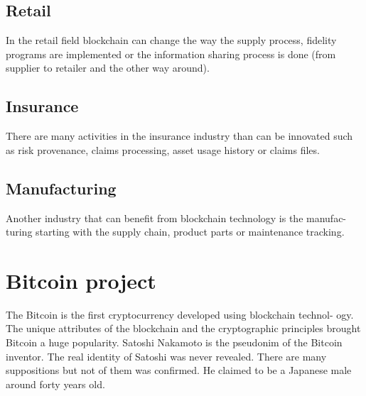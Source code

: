 \subsection{Retail}
\label{sub-sec:chapter2-subsection3}
In the retail field blockchain can change the way the supply process, fidelity
programs are implemented or the information sharing process is done (from
supplier to retailer and the other way around).

\subsection{Insurance}
\label{sub-sec:chapter2-subsection4}
There are many activities in the insurance industry than can be innovated such as risk provenance, claims processing, asset usage history or claims files.

\subsection{Manufacturing}
\label{sub-sec:chapter2-subsection5}
Another industry that can benefit from blockchain technology is the manufac-
turing starting with the supply chain, product parts or maintenance tracking.

\section{Bitcoin project}
The Bitcoin is the first cryptocurrency developed using blockchain technol-
ogy. The unique attributes of the blockchain and the cryptographic principles
brought Bitcoin a huge popularity. Satoshi Nakamoto is the pseudonim of the
Bitcoin inventor. The real identity of Satoshi was never revealed. There are
many suppositions but not of them was confirmed. He claimed to be a Japanese
male around forty years old.
